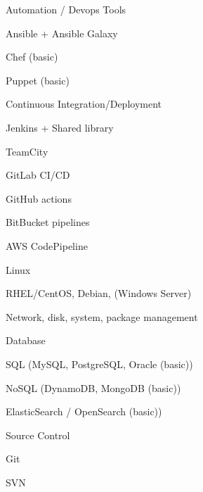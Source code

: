 \begin{cvskills}
  \cvskill
    {Automation / Devops Tools} %
    {
      \begin{cvitems} %
        \item {Ansible + Ansible Galaxy} %
        \item {Chef (basic)} %
        \item {Puppet (basic)} %
      \end{cvitems}
    }

  \cvskill
    {Continuous Integration/Deployment} %
    {
      \begin{cvitems} %
        \item {Jenkins + Shared library} %
        \item {TeamCity} %
        \item {GitLab CI/CD} %
        \item {GitHub actions} %
        \item {BitBucket pipelines} %
        \item {AWS CodePipeline} %
      \end{cvitems}
    }

  \cvskill
    {Linux} %
    {
      \begin{cvitems} %
        \item {RHEL/CentOS, Debian, (Windows Server)} %
        \item {Network, disk, system, package management} %
      \end{cvitems}
    }

  \cvskill
    {Database} %
    {
      \begin{cvitems} %
        \item {SQL (MySQL, PostgreSQL, Oracle (basic))} %
        \item {NoSQL (DynamoDB, MongoDB (basic))} %
        \item {ElasticSearch / OpenSearch (basic))} %
      \end{cvitems}
    }

  \cvskill
    {Source Control} %
    {
      \begin{cvitems} %
        \item {Git} %
        \item {SVN} %
      \end{cvitems}
    }


\end{cvskills}
